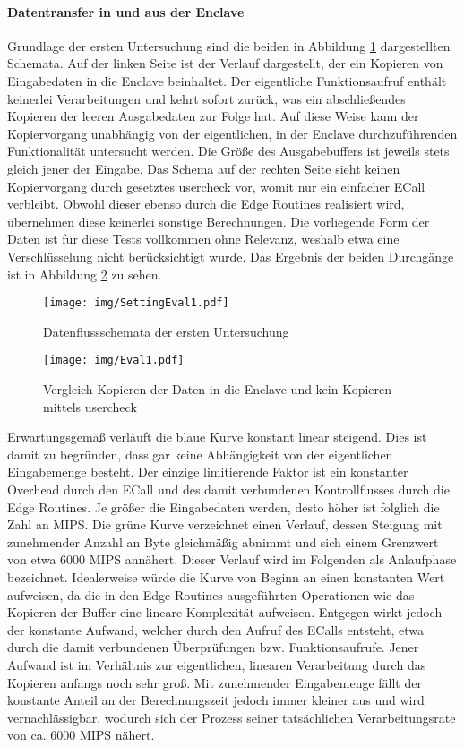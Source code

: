 \paragraph{Datentransfer in und aus der Enclave}

Grundlage der ersten Untersuchung sind die beiden in Abbildung \ref{fig:settingeval1} dargestellten Schemata. Auf der linken Seite ist der Verlauf dargestellt, der ein Kopieren von Eingabedaten in die Enclave beinhaltet. Der eigentliche Funktionsaufruf enthält keinerlei Verarbeitungen und kehrt sofort zurück, was ein abschließendes Kopieren der leeren Ausgabedaten zur Folge hat. Auf diese Weise kann der Kopiervorgang unabhängig von der eigentlichen, in der Enclave durchzuführenden Funktionalität untersucht werden. Die Größe des Ausgabebuffers ist jeweils stets gleich jener der Eingabe. Das Schema auf der rechten Seite sieht keinen Kopiervorgang durch gesetztes user\textunderscore check vor, womit nur ein einfacher \ac{ECall} verbleibt. Obwohl dieser ebenso durch die Edge Routines realisiert wird, übernehmen diese keinerlei sonstige Berechnungen. Die vorliegende Form der Daten ist für diese Tests vollkommen ohne Relevanz, weshalb etwa eine Verschlüsselung nicht berücksichtigt wurde. Das Ergebnis der beiden Durchgänge ist in Abbildung \ref{fig:eval1} zu sehen.

\begin{figure}[H]
	\texttt{[image: img/SettingEval1.pdf]}
	\centering
	\caption{Datenflussschemata der ersten Untersuchung}
	\label{fig:settingeval1}
\end{figure}

\begin{figure}[H]
	\texttt{[image: img/Eval1.pdf]}
	\centering
	\caption{Vergleich Kopieren der Daten in die Enclave und kein Kopieren mittels user\textunderscore check}
	\label{fig:eval1}
\end{figure}

Erwartungsgemäß verläuft die blaue Kurve konstant linear steigend. Dies ist damit zu begründen, dass gar keine Abhängigkeit von der eigentlichen Eingabemenge besteht. Der einzige limitierende Faktor ist ein konstanter Overhead durch den \ac{ECall} und des damit verbundenen Kontrollflusses durch die Edge Routines. Je größer die Eingabedaten werden, desto höher ist folglich die Zahl an \ac{MIPS}. Die grüne Kurve verzeichnet einen Verlauf, dessen Steigung mit zunehmender Anzahl an Byte gleichmäßig abnimmt und sich einem Grenzwert von etwa 6000 \ac{MIPS} annähert. Dieser Verlauf wird im Folgenden als Anlaufphase bezeichnet. Idealerweise würde die Kurve von Beginn an einen konstanten Wert aufweisen, da die in den Edge Routines ausgeführten Operationen wie das Kopieren der Buffer eine lineare Komplexität aufweisen. Entgegen wirkt jedoch der konstante Aufwand, welcher durch den Aufruf des \acp{ECall} entsteht, etwa durch die damit verbundenen Überprüfungen bzw. Funktionsaufrufe. Jener Aufwand ist im Verhältnis zur eigentlichen, linearen Verarbeitung durch das Kopieren anfangs noch sehr groß. Mit zunehmender Eingabemenge fällt der konstante Anteil an der Berechnungszeit jedoch immer kleiner aus und wird vernachlässigbar, wodurch sich der Prozess seiner tatsächlichen Verarbeitungsrate von ca. 6000 \ac{MIPS} nähert.


